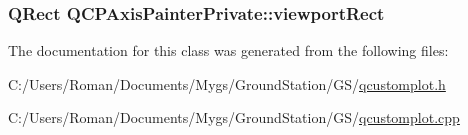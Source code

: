 \subsubsection[{viewport\+Rect}]{\setlength{\rightskip}{0pt plus 5cm}Q\+Rect Q\+C\+P\+Axis\+Painter\+Private\+::viewport\+Rect}\label{class_q_c_p_axis_painter_private_a8627dc6b40781e3291bb508e4ac574d6}


The documentation for this class was generated from the following files\+:\begin{DoxyCompactItemize}
\item 
C\+:/\+Users/\+Roman/\+Documents/\+Mygs/\+Ground\+Station/\+G\+S/\hyperlink{qcustomplot_8h}{qcustomplot.\+h}\item 
C\+:/\+Users/\+Roman/\+Documents/\+Mygs/\+Ground\+Station/\+G\+S/\hyperlink{qcustomplot_8cpp}{qcustomplot.\+cpp}\end{DoxyCompactItemize}
